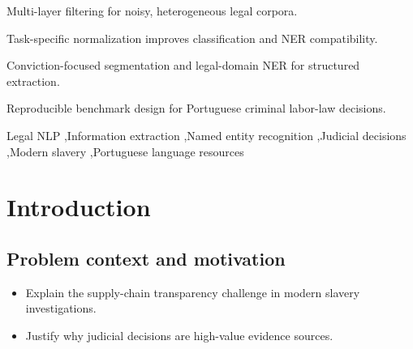 \documentclass[a4paper,fleqn]{cas-sc}
\begin{document}
\begin{abstract}
This paper presents a multi-layer legal NLP framework for extracting structured information from Brazilian criminal labor-law judicial decisions related to modern slavery. Starting from a heterogeneous corpus (2,581 documents), the framework applies: (i) document-type filtering to retain only final decisions, (ii) legal-text normalization with task-specific outputs for classification and NER, (iii) penal-merit classification using Legal-BERT embeddings with classical classifiers, (iv) LLM-assisted sentence segmentation for conviction-focused documents, and (v) legal-domain NER for entity extraction. We describe the full pipeline, evaluation protocol, and error analysis, and discuss practical deployment constraints, reproducibility, and ethical/legal considerations. Results indicate that layered filtering and task-oriented preprocessing substantially improve downstream extraction quality in low-resource legal settings.
\end{abstract}

\begin{highlights}
\item Multi-layer filtering for noisy, heterogeneous legal corpora.
\item Task-specific normalization improves classification and NER compatibility.
\item Conviction-focused segmentation and legal-domain NER for structured extraction.
\item Reproducible benchmark design for Portuguese criminal labor-law decisions.
\end{highlights}

\begin{keywords}
Legal NLP \sep Information extraction \sep Named entity recognition \sep Judicial decisions \sep Modern slavery \sep Portuguese language resources
\end{keywords}

\maketitle

\section{Introduction}
\label{sec:introduction}
\subsection{Problem context and motivation}
\begin{itemize}
    \item Explain the supply-chain transparency challenge in modern slavery investigations.
    \item Justify why judicial decisions are high-value evidence sources.
\end{itemize}
\end{document}

